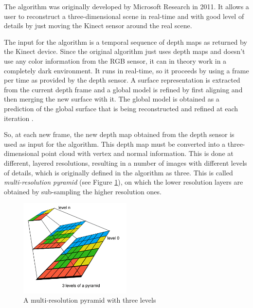 \documentclass[msc, a4paper, classic, en]{ufbathesis}
\begin{document}
The algorithm was originally developed by Microsoft Research in 2011. It allows a user to reconstruct a three-dimensional scene in real-time and with good level of details by just moving the Kinect sensor around the real scene.

The input for the algorithm is a temporal sequence of depth maps as returned by the Kinect device. Since the original algorithm just uses depth maps and doesn't use any color information from the RGB sensor, it can in theory work in a completely dark environment. It runs in real-time, so it proceeds by using a frame per time as provided by the depth sensor. A surface representation is extracted from the current depth frame and a global model is refined by first aligning and then merging the new surface with it. The global model is obtained as a prediction of the global surface that is being reconstructed and refined at each iteration \cite{michele}.

So, at each new frame, the new depth map obtained from the depth sensor is used as input for the algorithm. This depth map must be converted into a three-dimensional point cloud with vertex and normal information. This is done at different, layered resolutions, resulting in a number of images with different levels of details, which is originally defined in the algorithm as three. This is called \textit{multi-resolution pyramid} (see Figure \ref{fig:pyr}), on which the lower resolution layers are obtained by sub-sampling the higher resolution ones.

\begin{figure}
\centering
\includegraphics[width=0.5\textwidth]{images/pyr.png}
\caption{A multi-resolution pyramid with three levels \cite{michele}}
\label{fig:pyr}
\end{figure}
\end{document}
